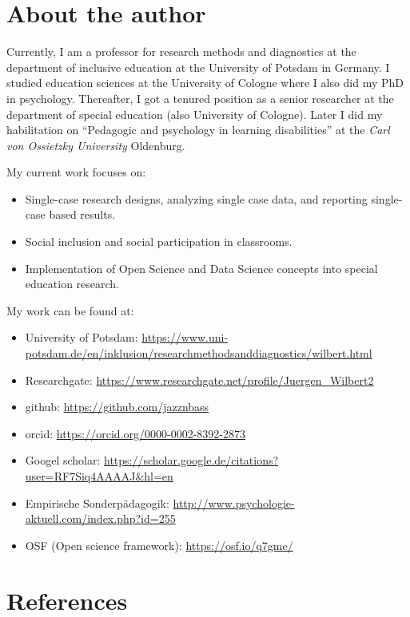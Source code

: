 \documentclass[
]{book}
\providecommand{\tightlist}{%
  \setlength{\itemsep}{0pt}\setlength{\parskip}{0pt}}
\begin{document}
\hypertarget{about-the-author}{%
\chapter*{About the author}\label{about-the-author}}

Currently, I am a professor for research methods and diagnostics at the department of inclusive education at the University of Potsdam in Germany. I studied education sciences at the University of Cologne where I also did my PhD in psychology. Thereafter, I got a tenured position as a senior researcher at the department of special education (also University of Cologne). Later I did my habilitation on ``Pedagogic and psychology in learning disabilities'' at the \emph{Carl von Ossietzky University} Oldenburg.

My current work focuses on:

\begin{itemize}
\tightlist
\item
  Single-case research designs, analyzing single case data, and reporting single-case based results.
\item
  Social inclusion and social participation in classrooms.
\item
  Implementation of Open Science and Data Science concepts into special education research.
\end{itemize}

My work can be found at:

\begin{itemize}
\tightlist
\item
  University of Potsdam: \url{https://www.uni-potsdam.de/en/inklusion/researchmethodsanddiagnostics/wilbert.html}
\item
  Researchgate: \url{https://www.researchgate.net/profile/Juergen_Wilbert2}
\item
  github: \url{https://github.com/jazznbass}
\item
  orcid: \url{https://orcid.org/0000-0002-8392-2873}
\item
  Googel scholar: \url{https://scholar.google.de/citations?user=RF7Siq4AAAAJ\&hl=en}
\item
  Empirische Sonderpädagogik: \url{http://www.psychologie-aktuell.com/index.php?id=255}
\item
  OSF (Open science framework): \url{https://osf.io/q7gme/}
\end{itemize}

\hypertarget{references}{%
\chapter*{References}\label{references}}
\end{document}
